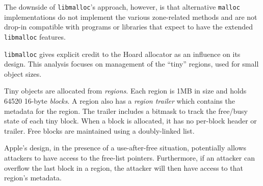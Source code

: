 The downside of \texttt{libmalloc}'s approach, however, is that
alternative \texttt{malloc} implementations do not implement the various
zone-related methods and are not drop-in compatible with programs or
libraries that expect to have the extended \texttt{libmalloc} features.

\texttt{libmalloc} gives explicit credit to the Hoard allocator as an
influence on its design. This analysis focuses on management of the ``tiny''
regions, used for small object sizes.

Tiny objects are allocated from {\em regions}.
Each region is 1MB in
size and holds 64520 16-byte {\em blocks}.
A region also has a {\em region trailer} which contains the
metadata for the region.
The trailer includes a bitmask to track the free/busy
state of each tiny block. When a block is allocated, it has no
per-block header or trailer. Free blocks are maintained using a
doubly-linked list.

Apple's design, in the presence of a use-after-free situation,
potentially allows attackers to have access to the free-list
pointers. Furthermore, if an attacker can overflow the last block in a
region, the attacker will then have access to that region's metadata.

